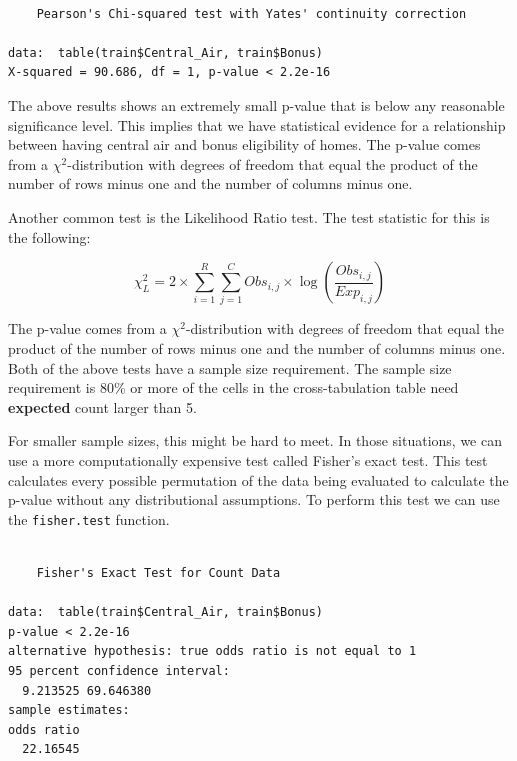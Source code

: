 \documentclass[
  letterpaper,
  DIV=11,
  numbers=noendperiod]{scrreprt}
\newenvironment{Shaded}{\begin{snugshade}}{\end{snugshade}}
\newcommand{\FunctionTok}[1]{\textcolor[rgb]{0.28,0.35,0.67}{#1}}
\newcommand{\NormalTok}[1]{\textcolor[rgb]{0.00,0.23,0.31}{#1}}
\newcommand{\SpecialCharTok}[1]{\textcolor[rgb]{0.37,0.37,0.37}{#1}}
\begin{document}
\begin{verbatim}

    Pearson's Chi-squared test with Yates' continuity correction

data:  table(train$Central_Air, train$Bonus)
X-squared = 90.686, df = 1, p-value < 2.2e-16
\end{verbatim}

The above results shows an extremely small p-value that is below any
reasonable significance level. This implies that we have statistical
evidence for a relationship between having central air and bonus
eligibility of homes. The p-value comes from a \(\chi^2\)-distribution
with degrees of freedom that equal the product of the number of rows
minus one and the number of columns minus one.

Another common test is the Likelihood Ratio test. The test statistic for
this is the following:

\[
\chi^2_L = 2 \times \sum_{i=1}^R \sum_{j=1}^C Obs_{i,j} \times \log(\frac{Obs_{i,j}}{Exp_{i,j}})
\]

The p-value comes from a \(\chi^2\)-distribution with degrees of freedom
that equal the product of the number of rows minus one and the number of
columns minus one. Both of the above tests have a sample size
requirement. The sample size requirement is 80\% or more of the cells in
the cross-tabulation table need \textbf{expected} count larger than 5.

For smaller sample sizes, this might be hard to meet. In those
situations, we can use a more computationally expensive test called
Fisher's exact test. This test calculates every possible permutation of
the data being evaluated to calculate the p-value without any
distributional assumptions. To perform this test we can use the
\texttt{fisher.test} function.

\begin{Shaded}
\end{Shaded}

\begin{verbatim}

    Fisher's Exact Test for Count Data

data:  table(train$Central_Air, train$Bonus)
p-value < 2.2e-16
alternative hypothesis: true odds ratio is not equal to 1
95 percent confidence interval:
  9.213525 69.646380
sample estimates:
odds ratio 
  22.16545 
\end{verbatim}
\end{document}
